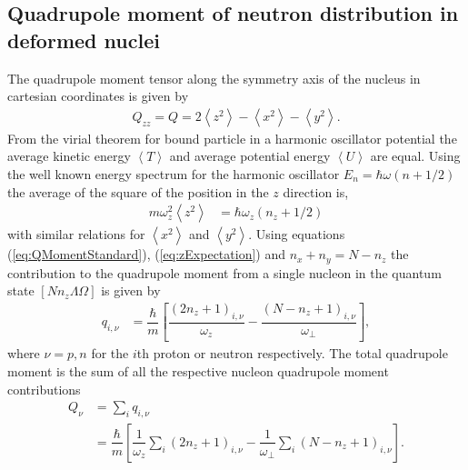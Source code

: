 \documentclass[8pt,a4paper, twoside]{report}
\begin{document}
\subsection{Quadrupole moment of neutron distribution in deformed nuclei}

The quadrupole moment tensor along the symmetry axis of the nucleus in cartesian coordinates is given by
\begin{align}\label{eq:QMomentStandard}
Q_{zz} = Q = 2\left<z^2\right> - \left<x^2\right> - \left<y^2\right> .
\end{align}
From the virial theorem for bound particle in a harmonic oscillator potential the average kinetic energy $\left<T\right>$ and average potential energy $\left<U\right>$ are equal. Using the well known energy spectrum for the harmonic oscillator $E_{n} = \hbar\omega(n + 1/2)$  the average of the square of the position in the $z$ direction is,
\begin{align}\label{eq:zExpectation}
m\omega_z^2\left<z^2\right>&= \hbar\omega_z\left(n_z + 1/2\right) 
\end{align}
  with similar relations for $\left<x^2\right>$ and $\left<y^2\right>$. Using equations (\ref{eq:QMomentStandard}), (\ref{eq:zExpectation}) and $n_x + n_y = N - n_z$ the contribution to the quadrupole moment from a single nucleon in the quantum state $\left[N n_z \Lambda \Omega\right]$ is given by
\begin{align} \label{eq:QMomentNucleon}
q_{i,\nu} &= \dfrac{\hbar}{m}\left[\dfrac{\left(2n_z + 1\right)_{i,\nu}}{\omega_z} - \dfrac{\left(N -n_z + 1\right)_{i,\nu}}{\omega_{\perp}}\right] ,
\end{align}
where $\nu = p,n$ for the $i$th proton or neutron respectively. The total quadrupole moment is the sum of all the respective nucleon quadrupole moment contributions
\begin{align}
Q_{\nu} &= \sum_{i} q_{i,\nu} \nonumber\\
&= \dfrac{\hbar}{m}\left[\dfrac{1}{\omega_z}\sum_{i}\left(2n_z + 1\right)_{i,\nu} - \dfrac{1}{\omega_{\perp}}\sum_{i}\left(N -n_z + 1\right)_{i,\nu}\right]. \label{eq:CollectiveMDim} 
\end{align}
\end{document}
